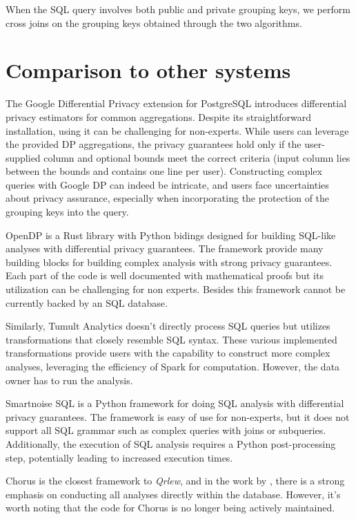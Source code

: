 \documentclass[letterpaper]{article} %
\newcommand{\qrlew}{\emph{Qrlew}}
\begin{document}
When the SQL query involves both public and private grouping keys, we perform cross joins on the grouping keys obtained through the two algorithms.

\section{Comparison to other systems}

The Google Differential Privacy extension for PostgreSQL introduces differential privacy estimators for common aggregations.
Despite its straightforward installation, using it can be challenging for non-experts.
While users can leverage the provided DP aggregations,
the privacy guarantees hold only if the user-supplied column and optional bounds meet the correct criteria (input column lies between the bounds and contains one line per user).
Constructing complex queries with Google DP can indeed be intricate, and users face uncertainties about privacy assurance,
especially when incorporating the protection of the grouping keys into the query.

OpenDP is a Rust library with Python bidings designed for building SQL-like analyses with differential privacy guarantees.
The framework provide many building blocks for building complex analysis with strong privacy guarantees.
Each part of the code is well documented with mathematical proofs but
its utilization can be challenging for non experts.
Besides this framework cannot be currently backed by an SQL database.

Similarly, Tumult Analytics doesn't directly process SQL queries but utilizes transformations that closely resemble SQL syntax.
These various implemented transformations provide users with the capability to construct more complex analyses,
leveraging the efficiency of Spark for computation.
However, the data owner has to run the analysis.

Smartnoise SQL is a Python framework for doing SQL analysis with differential privacy guarantees.
The framework is easy of use for non-experts, but it does not support all SQL grammar such as complex queries with joins or subqueries.
Additionally, the execution of SQL analysis requires a Python post-processing step, potentially leading to increased execution times.

Chorus is the closest framework to \qrlew, and in the work by \citeauthor{johnson2020chorus},
there is a strong emphasis on conducting all analyses directly within the database.
However, it's worth noting that the code for Chorus is no longer being actively maintained.
\end{document}
